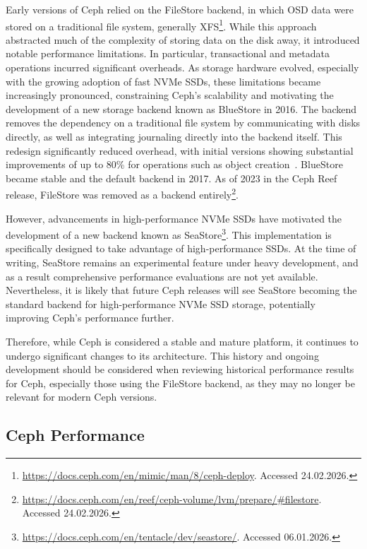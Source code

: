 Early versions of Ceph relied on the FileStore backend, in which \ac{OSD} data were stored on a traditional file system, generally XFS\footnote{\url{https://docs.ceph.com/en/mimic/man/8/ceph-deploy}. Accessed 24.02.2026.}. While this approach abstracted much of the complexity of storing data on the disk away, it introduced notable performance limitations. In particular, transactional and metadata operations incurred significant overheads. As storage hardware evolved, especially with the growing adoption of fast \ac{NVMe} \acp{SSD}, these limitations became increasingly pronounced, constraining Ceph's scalability and motivating the development of a new storage backend known as BlueStore in 2016. The backend removes the dependency on a traditional file system by communicating with disks directly, as well as integrating journaling directly into the backend itself. This redesign significantly reduced overhead, with initial versions showing substantial improvements of up to 80\% for operations such as object creation~\cite[p.~358]{filesystems-unfit-bluestore}. BlueStore became stable and the default backend in 2017. As of 2023 in the Ceph Reef release, FileStore was removed as a backend entirely\footnote{\url{https://docs.ceph.com/en/reef/ceph-volume/lvm/prepare/\#filestore}. Accessed 24.02.2026.}.

However, advancements in high-performance \ac{NVMe} \acp{SSD} have motivated the development of a new backend known as SeaStore\footnote{\url{https://docs.ceph.com/en/tentacle/dev/seastore/}. Accessed 06.01.2026.}. This implementation is specifically designed to take advantage of high-performance \acp{SSD}. At the time of writing, SeaStore remains an experimental feature under heavy development, and as a result comprehensive performance evaluations are not yet available. Nevertheless, it is likely that future Ceph releases will see SeaStore becoming the standard backend for high-performance \ac{NVMe} \ac{SSD} storage, potentially improving Ceph's performance further.

Therefore, while Ceph is considered a stable and mature platform, it continues to undergo significant changes to its architecture. This history and ongoing development should be considered when reviewing historical performance results for Ceph, especially those using the FileStore backend, as they may no longer be relevant for modern Ceph versions.

\subsection{Ceph Performance}

